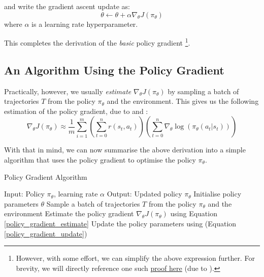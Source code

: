 \documentclass{article} %
\begin{document}
and write the gradient ascent update as:
\begin{equation} \label{policy_gradient_update}
    \theta \leftarrow \theta + \alpha \nabla_\theta J(\pi_\theta)
\end{equation} 
where $\alpha$ is a learning rate hyperparameter.

This completes the derivation of the \textit{basic} policy gradient \footnote{
However, with some effort, we can simplify the above expression further.
For brevity, we will directly reference one such \href{https://spinningup.openai.com/en/latest/spinningup/extra_pg_proof1.html}{proof here} (due to \cite{SpinningUp-2018}).
}.

\subsection{An Algorithm Using the Policy Gradient}


Practically, however, we usually \textit{estimate} $\nabla_\theta J(\pi_\theta)$ by sampling a batch of trajectories $T$ from the policy $\pi_\theta$ and the environment.
This gives us the following estimation of the policy gradient, due to \cite{Sutton-and-Barto-1998} and \cite{SpinningUp-2018}:
\begin{equation} \label{policy_gradient_estimate}
    \nabla_\theta J(\pi_\theta) \approx \frac{1}{m} \sum_{i=1}^{m} \left(\sum_{t=0}^{n} r(s_t, a_t)\right) \left( \sum_{t=0}^{n} \nabla_\theta \log(\pi_\theta(a_t | s_t)) \right)
\end{equation}

With that in mind, we can now summarise the above derivation into a simple algorithm that uses the policy gradient to optimise the policy $\pi_\theta$.

\begin{algorithm}[H]
    \caption{Policy Gradient Algorithm}
    \label{alg:policy_gradient}
    \begin{algorithmic}[1]
        \State Input: Policy $\pi_\theta$, learning rate $\alpha$
        \State Output: Updated policy $\pi_\theta$
        \State Initialise policy parameters $\theta$
            \State Sample a batch of trajectories $T$ from the policy $\pi_\theta$ and the environment
            \State Estimate the policy gradient $\nabla_\theta J(\pi_\theta)$ using Equation \eqref{policy_gradient_estimate}
            \State Update the policy parameters using (Equation \eqref{policy_gradient_update})
        \EndWhile
    \end{algorithmic}
\end{algorithm}
\end{document}
